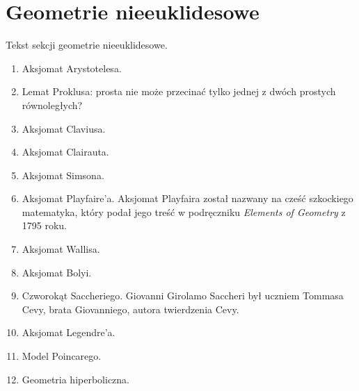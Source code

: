 %

\chapter{Geometrie nieeuklidesowe}
Tekst sekcji geometrie nieeuklidesowe.
\begin{enumerate}
	\item Aksjomat Arystotelesa. 
	\item Lemat Proklusa: prosta nie może przecinać tylko jednej z dwóch prostych równoległych? 
	\item Aksjomat Claviusa. 
	\item Aksjomat Clairauta. 
	\item Aksjomat Simsona. 
	\item Aksjomat Playfaire'a. 
	Aksjomat Playfaira został nazwany na cześć szkockiego matematyka, który podał jego treść w podręczniku \emph{Elements of Geometry} z 1795 roku.
%
	\item Aksjomat Wallisa. 
	\item Aksjomat Bolyi. 
	\item Czworokąt Saccheriego. %
	Giovanni Girolamo Saccheri był uczniem Tommasa Cevy, brata Giovanniego, autora twierdzenia Cevy.
	\item Aksjomat Legendre'a. 
	\item Model Poincarego. 
	\item Geometria hiperboliczna. 
\end{enumerate}

%